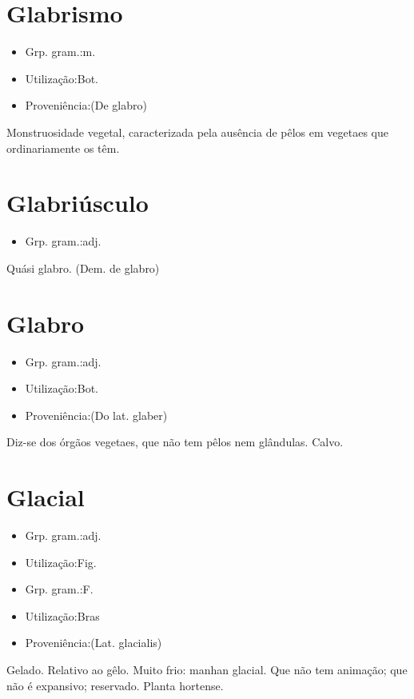 \section{Glabrismo}
\begin{itemize}
\item {Grp. gram.:m.}
\end{itemize}
\begin{itemize}
\item {Utilização:Bot.}
\end{itemize}
\begin{itemize}
\item {Proveniência:(De \textunderscore glabro\textunderscore )}
\end{itemize}
Monstruosidade vegetal, caracterizada pela ausência de pêlos em vegetaes que ordinariamente os têm.
\section{Glabriúsculo}
\begin{itemize}
\item {Grp. gram.:adj.}
\end{itemize}
Quási glabro.
(Dem. de \textunderscore glabro\textunderscore )
\section{Glabro}
\begin{itemize}
\item {Grp. gram.:adj.}
\end{itemize}
\begin{itemize}
\item {Utilização:Bot.}
\end{itemize}
\begin{itemize}
\item {Proveniência:(Do lat. \textunderscore glaber\textunderscore )}
\end{itemize}
Diz-se dos órgãos vegetaes, que não tem pêlos nem glândulas.
Calvo.
\section{Glacial}
\begin{itemize}
\item {Grp. gram.:adj.}
\end{itemize}
\begin{itemize}
\item {Utilização:Fig.}
\end{itemize}
\begin{itemize}
\item {Grp. gram.:F.}
\end{itemize}
\begin{itemize}
\item {Utilização:Bras}
\end{itemize}
\begin{itemize}
\item {Proveniência:(Lat. \textunderscore glacialis\textunderscore )}
\end{itemize}
Gelado.
Relativo ao gêlo.
Muito frio: \textunderscore manhan glacial\textunderscore .
Que não tem animação; que não é expansivo; reservado.
Planta hortense.
